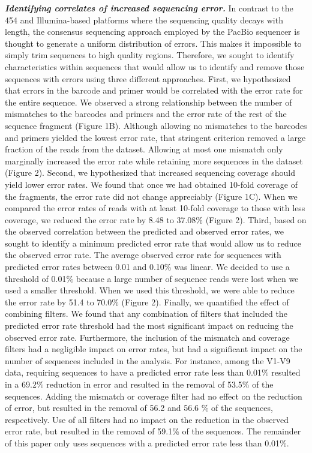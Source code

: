 \documentclass[11pt,]{article}
\begin{document}
\textbf{\emph{Identifying correlates of increased sequencing error.}} In
contrast to the 454 and Illumina-based platforms where the sequencing
quality decays with length, the consensus sequencing approach employed
by the PacBio sequencer is thought to generate a uniform distribution of
errors. This makes it impossible to simply trim sequences to high
quality regions. Therefore, we sought to identify characteristics within
sequences that would allow us to identify and remove those sequences
with errors using three different approaches. First, we hypothesized
that errors in the barcode and primer would be correlated with the error
rate for the entire sequence. We observed a strong relationship between
the number of mismatches to the barcodes and primers and the error rate
of the rest of the sequence fragment (Figure 1B). Although allowing no
mismatches to the barcodes and primers yielded the lowest error rate,
that stringent criterion removed a large fraction of the reads from the
dataset. Allowing at most one mismatch only marginally increased the
error rate while retaining more sequences in the dataset (Figure 2).
Second, we hypothesized that increased sequencing coverage should yield
lower error rates. We found that once we had obtained 10-fold coverage
of the fragments, the error rate did not change appreciably (Figure 1C).
When we compared the error rates of reads with at least 10-fold coverage
to those with less coverage, we reduced the error rate by 8.48 to
37.08\% (Figure 2). Third, based on the observed correlation between the
predicted and observed error rates, we sought to identify a minimum
predicted error rate that would allow us to reduce the observed error
rate. The average observed error rate for sequences with predicted error
rates between 0.01 and 0.10\% was linear. We decided to use a threshold
of 0.01\% because a large number of sequence reads were lost when we
used a smaller threshold. When we used this threshold, we were able to
reduce the error rate by 51.4 to 70.0\% (Figure 2). Finally, we
quantified the effect of combining filters. We found that any
combination of filters that included the predicted error rate threshold
had the most significant impact on reducing the observed error rate.
Furthermore, the inclusion of the mismatch and coverage filters had a
negligible impact on error rates, but had a significant impact on the
number of sequences included in the analysis. For instance, among the
V1-V9 data, requiring sequences to have a predicted error rate less than
0.01\% resulted in a 69.2\% reduction in error and resulted in the
removal of 53.5\% of the sequences. Adding the mismatch or coverage
filter had no effect on the reduction of error, but resulted in the
removal of 56.2 and 56.6 \% of the sequences, respectively. Use of all
filters had no impact on the reduction in the observed error rate, but
resulted in the removal of 59.1\% of the sequences. The remainder of
this paper only uses sequences with a predicted error rate less than
0.01\%.
\end{document}
